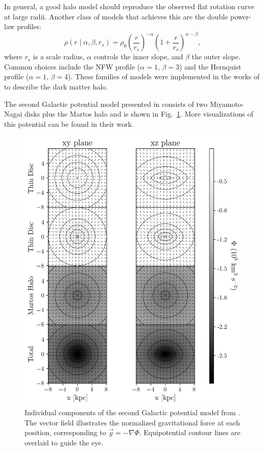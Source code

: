         In general, a good halo model should reproduce the observed flat rotation curve at large radii. Another class of models that achieves this are the double power-law profiles:
        \begin{equation}
            \rho(r \mid \alpha, \beta, r_s) = \rho_0 \left( \frac{r}{r_s} \right)^{-\alpha} \left(1 + \frac{r}{r_s} \right)^{\alpha - \beta},
        \end{equation}
        where $r_s$ is a scale radius, $\alpha$ controls the inner slope, and $\beta$ the outer slope. Common choices include the NFW profile ($\alpha = 1$, $\beta = 3$) and the Hernquist profile ($\alpha = 1$, $\beta = 4$). These families of models were implemented in the works of \citet{2015ApJS..216...29B, 2017MNRAS.465...76M} to describe the dark matter halo.

        The second Galactic potential model presented in \citet{2017A&A...598A..66P} consists of two Miyamoto-Nagai disks plus the Martos halo and is shown in Fig.~\ref{fig:figure_pouliasis2017pii_potential}. More visualizations of this potential can be found in their work.
        \begin{figure}
            \centering
            \includegraphics[width=\linewidth]{images/figure_pouliasis2017pii_potential_-8_8.png}
            \caption{Individual components of the second Galactic potential model from \citet{2017A&A...598A..66P}. The vector field illustrates the normalized gravitational force at each position, corresponding to $\vec{g} = -\nabla\Phi$. Equipotential contour lines are overlaid to guide the eye.}
            \label{fig:figure_pouliasis2017pii_potential}
        \end{figure}        

